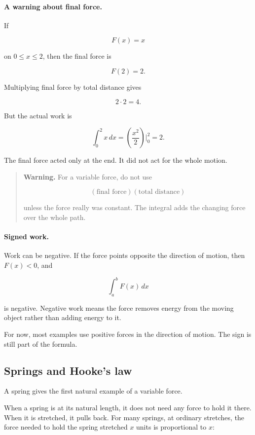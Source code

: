 \paragraph{A warning about final force.}
If

\[
F(x)=x
\]

on \(0\le x\le2\), then the final force is

\[
F(2)=2.
\]

Multiplying final force by total distance gives

\[
2\cdot2=4.
\]

But the actual work is

\[
\int_0^2 x\,dx
=
\left(\frac{x^2}{2}\right)\Big|_0^2
=
2.
\]

The final force acted only at the end.  It did not act for the whole motion.

\begin{quote}
\textbf{Warning.}
For a variable force, do not use

\[
(\text{final force})(\text{total distance})
\]

unless the force really was constant.  The integral adds the changing force over the
whole path.
\end{quote}

\paragraph{Signed work.}
Work can be negative.  If the force points opposite the direction of motion, then
\(F(x)<0\), and

\[
\int_a^b F(x)\,dx
\]

is negative.  Negative work means the force removes energy from the moving object
rather than adding energy to it.

For now, most examples use positive forces in the direction of motion.  The sign is
still part of the formula.

\subsection{Springs and Hooke's law}
\label{subsec:springs-hookes-law}

A spring gives the first natural example of a variable force.

When a spring is at its natural length, it does not need any force to hold it there.
When it is stretched, it pulls back.  For many springs, at ordinary stretches, the force
needed to hold the spring stretched \(x\) units is proportional to \(x\):

